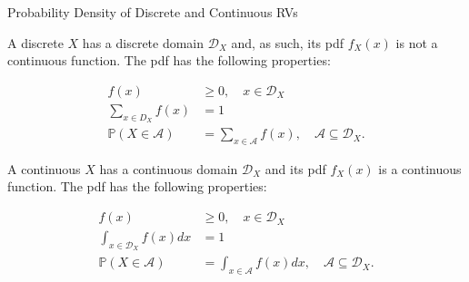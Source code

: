 \documentclass[9pt]{beamer}
\begin{document}
%
\begin{frame}{Probability Density of Discrete and Continuous RVs}

A discrete $X$ has a discrete domain $\mathcal{D}_X$ and, as such, its pdf $f_X(x)$ is not a continuous function. The pdf has the following properties:
\begin{block}{}

\begin{align*}
f(x)&\geq 0,\quad x\in \mathcal{D}_X\\
\sum_{x\in D_X}f(x)&=1\\
\mathbb{P}(X\in \mathcal{A})&=\sum_{x\in \mathcal{A}}f(x),\quad  \mathcal{A}\subseteq \mathcal{D}_X.
\end{align*}
\end{block}

A continuous $X$ has a continuous domain $\mathcal{D}_X$ and its pdf $f_X(x)$ is a continuous function. The pdf has the following properties:
\begin{block}{}
\begin{align*}
f(x)&\geq 0,\quad x\in \mathcal{D}_X\\
\int_{x\in \mathcal{D}_X}f(x)dx&=1\\
\mathbb{P}(X\in \mathcal{A})&=\int_{x\in \mathcal{A}}f(x)dx,\quad  \mathcal{A}\subseteq \mathcal{D}_X.
\end{align*}
\end{block}



\end{frame}
\end{document}
